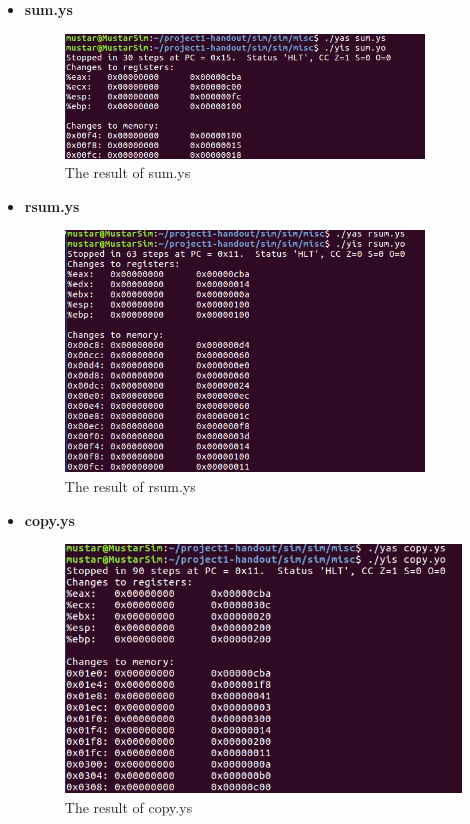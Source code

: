 \documentclass{article}
\begin{document}
	\begin{itemize}
		\item \textbf{sum.ys}

    \begin{figure}[H]
	\centering
	\includegraphics[width=0.9\textwidth]{sum.ys}
	\caption{The result of sum.ys}
	\end{figure}

		\item \textbf{rsum.ys}

    \begin{figure}[H]
	\centering
	\includegraphics[width=0.9\textwidth]{rsum.ys}
	\caption{The result of rsum.ys}
	\end{figure}
    \newpage
		\item \textbf{copy.ys}

    \begin{figure}[H]
	\centering
	\includegraphics[width=10.5cm]{copy.ys}
	\caption{The result of copy.ys}
	\end{figure}

	\end{itemize}
\end{document}
